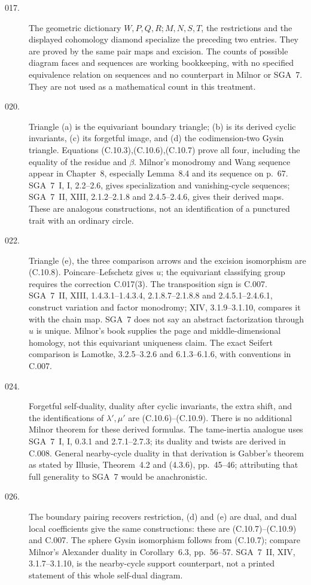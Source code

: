 \begin{description}
\item[017.] The geometric dictionary $W,P,Q,R;M,N,S,T$, the
restrictions and the displayed cohomology diamond specialize the
preceding two entries. They are proved by the same pair maps and
excision. The counts of possible diagram faces and sequences are
working bookkeeping, with no specified equivalence relation on
sequences and no counterpart in Milnor or SGA~7. They are not
used as a mathematical count in this treatment.

\item[020.] Triangle (a) is the equivariant boundary triangle;
(b) is its derived cyclic invariants, (c) its forgetful image, and
(d) the codimension-two Gysin triangle. Equations
(C.10.3),(C.10.6),(C.10.7) prove all four, including the equality
of the residue and $\beta$. Milnor's monodromy and Wang sequence
appear in Chapter~8, especially Lemma~8.4 and its sequence on p.~67.
SGA~7~I, I, 2.2--2.6, gives specialization and vanishing-cycle
sequences; SGA~7~II, XIII, 2.1.2--2.1.8 and 2.4.5--2.4.6, gives
their derived maps. These are analogous constructions, not an
identification of a punctured trait with an ordinary circle.

\item[022.] Triangle (e), the three comparison arrows and the
excision isomorphism are (C.10.8). Poincare--Lefschetz gives $u$;
the equivariant classifying group requires the correction
C.017(3). The transposition sign is C.007. SGA~7~II, XIII,
1.4.3.1--1.4.3.4, 2.1.8.7--2.1.8.8 and 2.4.5.1--2.4.6.1,
construct variation and factor monodromy; XIV, 3.1.9--3.1.10,
compares it with the chain map. SGA~7 does not say an abstract
factorization through $u$ is unique. Milnor's book supplies the
page and middle-dimensional homology, not this equivariant
uniqueness claim. The exact Seifert comparison is Lamotke,
3.2.5--3.2.6 and 6.1.3--6.1.6, with conventions in C.007.

\item[024.] Forgetful self-duality, duality after cyclic invariants,
the extra shift, and the identifications of $\lambda',\mu'$ are
(C.10.6)--(C.10.9). There is no additional Milnor theorem for these
derived formulas. The tame-inertia analogue uses SGA~7~I, I,
0.3.1 and 2.7.1--2.7.3; its duality and twists are derived in
C.008. General nearby-cycle duality in that derivation is
Gabber's theorem as stated by Illusie, Theorem~4.2 and (4.3.6),
pp.~45--46; attributing that full generality to SGA~7 would be
anachronistic.

\item[026.] The boundary pairing recovers restriction, (d) and (e)
are dual, and dual local coefficients give the same constructions:
these are (C.10.7)--(C.10.9) and C.007. The sphere Gysin
isomorphism follows from (C.10.7); compare Milnor's Alexander
duality in Corollary~6.3, pp.~56--57. SGA~7~II, XIV, 3.1.7--3.1.10, is the
nearby-cycle support counterpart, not a printed statement of this
whole self-dual diagram.


\end{description}
